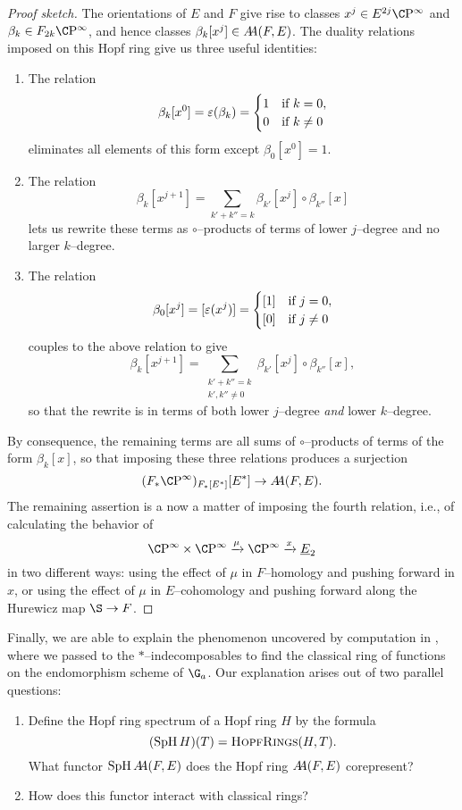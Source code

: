 \begin{proof}[Proof sketch]
The orientations of \(E\) and \(F\) give rise to classes \(x^j \in E^{2j} \CP^\infty\) and \(\beta_k \in F_{2k} \CP^\infty\), and hence classes \(\beta_k[x^j] \in \AA(F, E)\).  The duality relations imposed on this Hopf ring give us three useful identities:
\begin{enumerate}
    \item The relation \[\beta_k[x^0] = \eps(\beta_k) = \begin{cases} 1 & \text{if \(k = 0\)}, \\ 0 & \text{if \(k \ne 0\)}\end{cases}\] eliminates all elements of this form except \(\beta_0[x^0] = 1\).
    \item The relation \[\beta_k[x^{j+1}] = \sum_{k' + k'' = k} \beta_{k'}[x^j] \circ \beta_{k''}[x]\] lets us rewrite these terms as \(\circ\)--products of terms of lower \(j\)--degree and no larger \(k\)--degree.
    \item The relation \[\beta_0[x^j] = [\eps(x^j)] = \begin{cases} [1] & \text{if \(j = 0\)}, \\ [0] & \text{if \(j \ne 0\)}\end{cases}\] couples to the above relation to give \[\beta_k[x^{j+1}] = \sum_{\substack{k' + k'' = k \\ k', k'' \ne 0}} \beta_{k'}[x^j] \circ \beta_{k''}[x],\] so that the rewrite is in terms of both lower \(j\)--degree \emph{and} lower \(k\)--degree.
\end{enumerate}
By consequence, the remaining terms are all sums of \(\circ\)--products of terms of the form \(\beta_k[x]\), so that imposing these three relations produces a surjection \[(F_* \CP^\infty)_{F_*[E^*]}[E^*] \to \AA(F, E).\]  The remaining assertion is a now a matter of imposing the fourth relation, i.e., of calculating the behavior of \[\CP^\infty \times \CP^\infty \xrightarrow{\mu} \CP^\infty \xrightarrow{x} \OS{E}{2}\] in two different ways: using the effect of \(\mu\) in \(F\)--homology and pushing forward in \(x\), or using the effect of \(\mu\) in \(E\)--cohomology and pushing forward along the Hurewicz map \(\S \to F\).
\end{proof}



Finally, we are able to explain the phenomenon uncovered by computation in , where we passed to the \(\ast\)--indecomposables to find the classical ring of functions on the endomorphism scheme of \(\G_a\).  Our explanation arises out of two parallel questions:
\begin{enumerate}
	\item Define the Hopf ring spectrum of a Hopf ring \(H\) by the formula \[(\SpH H)(T) = \CatOf{HopfRings}(H, T).\]  What functor \(\SpH \AA(F, E)\) does the Hopf ring \(\AA(F, E)\) corepresent?
	\item How does this functor interact with classical rings?
\end{enumerate}

